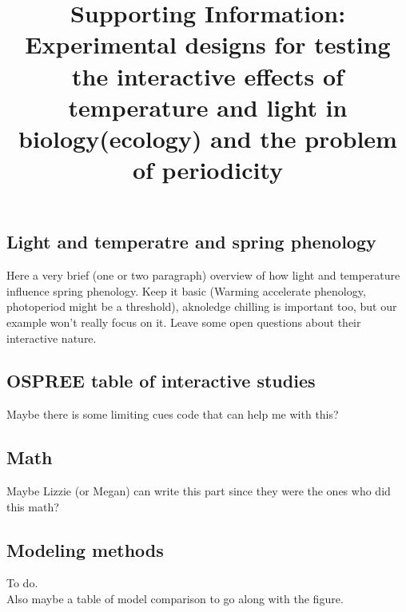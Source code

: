 \documentclass[11pt]{article}
\title{Supporting Information: Experimental designs for testing the interactive effects of temperature and light in biology(ecology) and the problem of periodicity }
\begin{document}
\maketitle
\subsection{Light and temperatre and spring phenology}
Here a very brief (one or two paragraph) overview of how light and temperature influence spring phenology. Keep it basic (Warming accelerate phenology, photoperiod might be a threshold), aknoledge chilling is important too, but our example won't really focus on it. Leave some open questions about their interactive nature.
\subsection{OSPREE table of interactive studies}
Maybe there is some limiting cues code that can help me with this?
\subsection{Math}
Maybe Lizzie (or Megan) can write this part since they were the ones who did this math?
\subsection{Modeling methods}
To do.\\
Also maybe a table of model comparison to go along with the figure.
\maketitle
\end{document}
